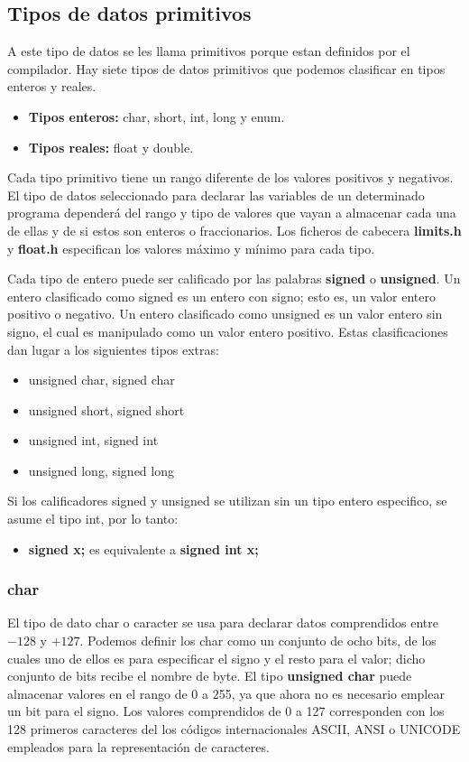 \documentclass[]{article}
\begin{document}
\subsection{Tipos de datos primitivos}
A este tipo de datos se les llama primitivos porque estan definidos por el compilador. Hay siete tipos de datos primitivos que podemos clasificar en tipos enteros y reales.

\begin{itemize}
	\item \textbf{Tipos enteros: } char, short, int, long y enum.
	\item \textbf{Tipos reales: } float y double.
\end{itemize}

Cada tipo primitivo tiene un rango diferente de los valores positivos y negativos. El tipo de datos seleccionado para declarar las variables de un determinado programa dependerá del rango y tipo de valores que vayan a almacenar cada una de ellas y de si estos son enteros o fraccionarios. Los ficheros de cabecera \textbf{limits.h} y \textbf{float.h} especifican los valores máximo y mínimo para cada tipo.

Cada tipo de entero puede ser calificado por las palabras \textbf{signed} o \textbf{unsigned}. Un entero clasificado como signed es un entero con signo; esto es, un valor entero positivo o negativo. Un entero clasificado como unsigned es un valor entero sin signo, el cual es manipulado como un valor entero positivo. Estas clasificaciones dan lugar a los siguientes tipos extras: 

\begin{itemize}
	\item unsigned char, signed char
	\item unsigned short, signed short
	\item unsigned int, signed int
	\item unsigned long, signed long
\end{itemize}

Si los calificadores signed y unsigned se utilizan sin un tipo entero especifico, se asume el tipo int, por lo tanto:

\begin{itemize}
	\item \textbf{signed x;} es equivalente a \textbf{signed int x;}
\end{itemize}

\subsubsection{char}
El tipo de dato char o caracter se usa para declarar datos comprendidos entre $-128$ y $+127$. Podemos definir los char como un conjunto de ocho bits, de los cuales uno de ellos es para especificar el signo y el resto para el valor; dicho conjunto de bits recibe el nombre de byte.
El tipo \textbf{unsigned char} puede almacenar valores en el rango de 0 a 255, ya que ahora no es necesario emplear un bit para el signo. Los valores comprendidos de 0 a 127 corresponden con los 128 primeros caracteres del los códigos internacionales ASCII, ANSI o UNICODE empleados para la representación de caracteres.
\end{document}
